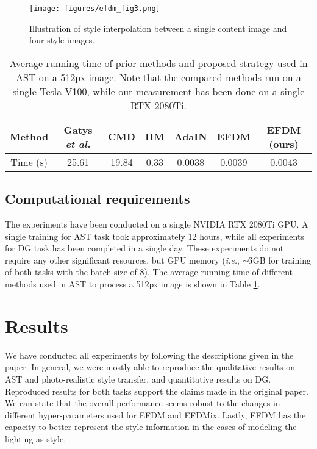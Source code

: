 \begin{figure}[!t] 
\centering
  \texttt{[image: figures/efdm\_fig3.png]}  
  \caption{Illustration of style interpolation between a single content image and four style images.}
\label{fig:fig3}
\end{figure}

\begin{table}[!t]
\centering
  \caption{Average running time of prior methods and proposed strategy used in AST on a 512px image. Note that the compared methods run on a single Tesla V100, while our measurement has been done on a single RTX 2080Ti.}
  \label{tab:avg-runtime}
    \begin{tabular}{c|cccccc}
        \hline
        \textbf{Method}  & \textbf{Gatys} \textit{et al.} \cite{gatys2016image}  &  \textbf{CMD} \cite{kalischek2021light}  & \textbf{HM}  & \textbf{AdaIN} \cite{huang2017arbitrary} & \textbf{EFDM} \cite{zhang2021exact} & \textbf{EFDM (ours)} \\
        \hline
        
         Time (s)        &   25.61       & 19.84             & 0.33           & 0.0038       &    0.0039        &       0.0043 \\
        \hline
    \end{tabular}
\end{table}

\subsection{Computational requirements}

The experiments have been conducted on a single NVIDIA RTX 2080Ti GPU. A single training for AST task took approximately 12 hours, while all experiments for DG task has been completed in a single day. These experiments do not require any other significant resources, but GPU memory (\textit{i.e.}, ${\raise.17ex\hbox{$\scriptstyle\mathtt{\sim}$}}6$GB for training of both tasks with the batch size of $8$). The average running time of different methods used in AST to process a 512px image is shown in Table \ref{tab:avg-runtime}.

\section{Results}
\label{sec:results}

We have conducted all experiments by following the descriptions given in the paper. In general, we were mostly able to reproduce the qualitative results on AST and photo-realistic style transfer, and quantitative results on DG. Reproduced results for both tasks support the claims made in the original paper. We can state that the overall performance seems robust to the changes in different hyper-parameters used for EFDM and EFDMix. Lastly, EFDM has the capacity to better represent the style information in the cases of modeling the lighting as style.


